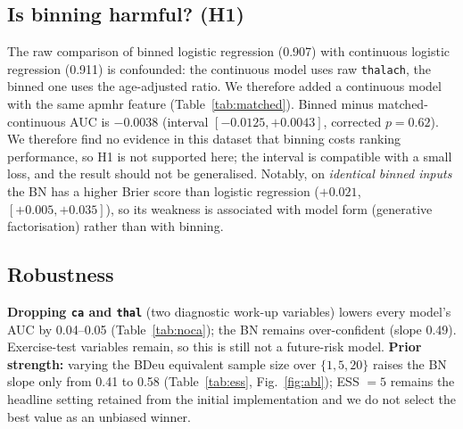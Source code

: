\documentclass[conference]{IEEEtran}
\begin{document}
\subsection{Is binning harmful? (H1)}
The raw comparison of binned logistic regression (0.907) with continuous logistic regression (0.911) is confounded: the continuous model uses raw \texttt{thalach}, the binned one uses the age-adjusted ratio. We therefore added a continuous model with the same $\mathrm{apmhr}$ feature (Table~\ref{tab:matched}). Binned minus matched-continuous AUC is $-0.0038$ (interval $[-0.0125,+0.0043]$, corrected $p=0.62$). We therefore find no evidence in this dataset that binning costs ranking performance, so H1 is not supported here; the interval is compatible with a small loss, and the result should not be generalised. Notably, on \emph{identical binned inputs} the BN has a higher Brier score than logistic regression ($+0.021$, $[+0.005,+0.035]$), so its weakness is associated with model form (generative factorisation) rather than with binning.

\begin{table}[!t]
\caption{Matched-input control for H1 (logistic regression)}
\label{tab:matched}
\centering
\small

\end{table}

\subsection{Robustness}
\textbf{Dropping \texttt{ca} and \texttt{thal}} (two diagnostic work-up variables) lowers every model's AUC by 0.04--0.05 (Table~\ref{tab:noca}); the BN remains over-confident (slope 0.49). Exercise-test variables remain, so this is still not a future-risk model. \textbf{Prior strength:} varying the BDeu equivalent sample size over $\{1,5,20\}$ raises the BN slope only from 0.41 to 0.58 (Table~\ref{tab:ess}, Fig.~\ref{fig:abl}); ESS $=5$ remains the headline setting retained from the initial implementation and we do not select the best value as an unbiased winner.

\begin{table}[!t]
\caption{Models fitted without \texttt{ca} and \texttt{thal} (same 25 splits)}
\label{tab:noca}
\centering
\small

\end{table}

\begin{table}[!t]
\caption{BDeu equivalent sample size sensitivity}
\label{tab:ess}
\centering
\footnotesize

\end{table}
\end{document}
